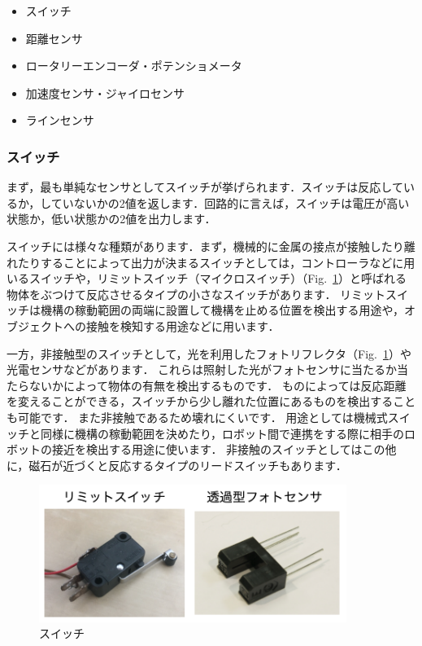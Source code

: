 \begin{itemize}
    \item スイッチ
    \item 距離センサ
    \item ロータリーエンコーダ・ポテンショメータ
    \item 加速度センサ・ジャイロセンサ
    \item ラインセンサ
\end{itemize}

\subsubsection{スイッチ}

まず，最も単純なセンサとしてスイッチが挙げられます．スイッチは反応しているか，していないかの2値を返します．回路的に言えば，スイッチは電圧が高い状態か，低い状態かの2値を出力します．

スイッチには様々な種類があります．まず，機械的に金属の接点が接触したり離れたりすることによって出力が決まるスイッチとしては，コントローラなどに用いるスイッチや，リミットスイッチ（マイクロスイッチ）（Fig.~\ref{fig:circuit_switch}）と呼ばれる物体をぶつけて反応させるタイプの小さなスイッチがあります．
リミットスイッチは機構の稼動範囲の両端に設置して機構を止める位置を検出する用途や，オブジェクトへの接触を検知する用途などに用います．

一方，非接触型のスイッチとして，光を利用したフォトリフレクタ（Fig.~\ref{fig:circuit_switch}）や光電センサなどがあります．
これらは照射した光がフォトセンサに当たるか当たらないかによって物体の有無を検出するものです．
ものによっては反応距離を変えることができる，スイッチから少し離れた位置にあるものを検出することも可能です．
また非接触であるため壊れにくいです．
用途としては機械式スイッチと同様に機構の稼動範囲を決めたり，ロボット間で連携をする際に相手のロボットの接近を検出する用途に使います．
非接触のスイッチとしてはこの他に，磁石が近づくと反応するタイプのリードスイッチもあります．

\begin{figure}[h]
  \centering
  \includegraphics[width=10cm]{circuit/fig/switch.png}
  \caption{スイッチ}
  \label{fig:circuit_switch}
\end{figure}


